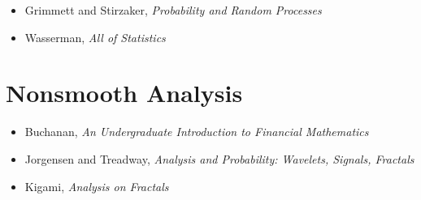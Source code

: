 \documentclass[article]{article}
\begin{document}
\begin{itemize}
	\item{Grimmett and Stirzaker, \textit{Probability and Random Processes}}
	\item{Wasserman, \textit{All of Statistics}}
\end{itemize}

\section{Nonsmooth Analysis}

\begin{itemize}
	\item{Buchanan, \textit{An Undergraduate Introduction to Financial Mathematics}}
	\item{Jorgensen and Treadway, \textit{Analysis and Probability: Wavelets, Signals, Fractals}}
	\item{Kigami, \textit{Analysis on Fractals}}
\end{itemize}


	
\end{document}
